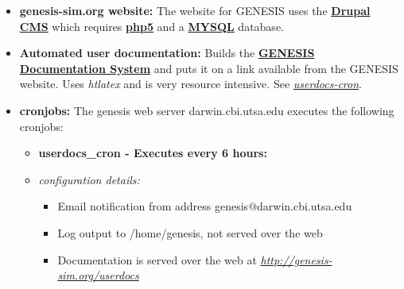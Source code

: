 \documentclass[12pt]{article}
\begin{document}
\begin{itemize}

\item {\bf genesis-sim.org website:} The website for GENESIS uses the \href{http://drupal.org/}{\bf Drupal CMS} which requires \href{http://www.php.net/}{\bf php5} and a \href{http://www.mysql.com/}{\bf MYSQL} database.

\item {\bf Automated user documentation:} Builds the \href{../documentation-overview/documentation-overview.tex}{\bf GENESIS Documentation System} and puts it on a link available from the GENESIS website.  Uses {\it htlatex} and is very resource intensive.  See \href{../userdocs-cron/userdocs-cron.tex}{\it userdocs-cron}.


\item {\bf cronjobs:} The genesis web server darwin.cbi.utsa.edu executes the following cronjobs:
\begin{itemize}
	\item {\bf userdocs\_cron - Executes every 6 hours:}
	\item {\it configuration details:} 
	\begin{itemize} 
	\item Email notification from address genesis@darwin.cbi.utsa.edu
	\item Log output to /home/genesis, not served over the web
	\item Documentation is served over the web at \href{http://genesis-sim.org/userdocs}{\it http://genesis-sim.org/userdocs}
	\end{itemize}
\end{itemize}
\end{itemize}
\end{document}
